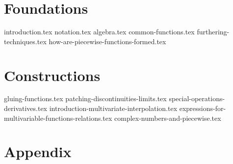 \documentclass[10pt,a4paper]{article}
\begin{document}
\maketitle
\tableofcontents
\newpage

\part{Foundations}
{introduction.tex}
{notation.tex}
{algebra.tex}
{common-functions.tex}
{furthering-techniques.tex}
{how-are-piecewise-functions-formed.tex}

\part{Constructions}
{gluing-functions.tex}
{patching-discontinuities-limits.tex}
{special-operations-derivatives.tex}
{introduction-multivariate-interpolation.tex}
{expressions-for-multivariable-functions-relations.tex}
{complex-numbers-and-piecewise.tex}

\part{Appendix}
\printglossary[title=Glossary, toctitle=Glossary]
\glsaddallunused
\end{document}
